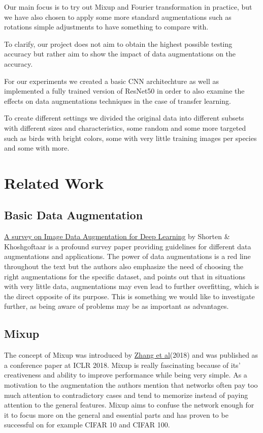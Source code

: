 \documentclass{article}
\begin{document}
Our main focus is to try out Mixup and Fourier transformation in practice, but we have also chosen to apply some more standard augmentations such as rotations simple adjustments to have something to compare with.

To clarify, our project does not aim to obtain the highest possible testing accuracy but rather aim to show the impact of data augmentations 
on the accuracy. 

For our experiments we created a basic CNN architechture as well as implemented a fully trained version of ResNet50 in order to also examine the effects on data augmentations techniques in the case of transfer learning.

To create different settings we divided the original data into different subsets with different sizes and characteristics, some random and some more targeted such as birds with bright colors, some with very little training images per species and some with more.

\section{Related Work}

\subsection{Basic Data Augmentation}

\href{https://link.springer.com/article/10.1186/s40537-019-0197-0}{A survey on Image Data Augmentation for Deep Learning} by Shorten \& Khoshgoftaar is a profound survey paper providing guidelines for different data augmentations and applications. The power of data augmentations is a red line throughout the text but the authors also emphasize the need of choosing the right augmentations for the specific dataset, and points out that in situations with very little data, augmentations may even lead to further overfitting, which is the direct opposite of its purpose. This is something we would like to investigate further, as being aware of problems may be as important as advantages.


\subsection{Mixup}

The concept of Mixup was introduced by \href{https://arxiv.org/pdf/1710.09412.pdf}{Zhang et al}(2018) and was published as a conference paper at ICLR 2018. Mixup is really fascinating because of its' creativeness and ability to improve performance while being very simple. As a motivation to the augmentation the authors mention that networks often pay too much attention to contradictory cases and tend to memorize instead of paying attention to the general features. Mixup aims to confuse the network enough for it to focus more on the general and essential parts and has proven to be successful on for example CIFAR 10 and CIFAR 100.
\end{document}
